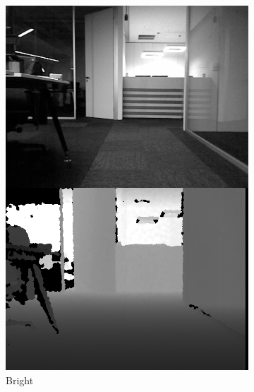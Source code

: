 \documentclass[]{spie}  %
\begin{document}
\begin{figure}
        \centering
        
        \begin{subfigure}[b]{0.27\textwidth}
        \centering
        \includegraphics[trim = 0mm 0mm 0mm 0mm, clip, width=\textwidth]{figures/dataset_bright.png}    
        \caption{Bright}
        \label{subfig:dataset_bright}
        \end{subfigure}
        ~ 
        \begin{subfigure}[b]{0.27\textwidth}
        \centering

\end{subfigure}
\end{figure}
\end{document}
